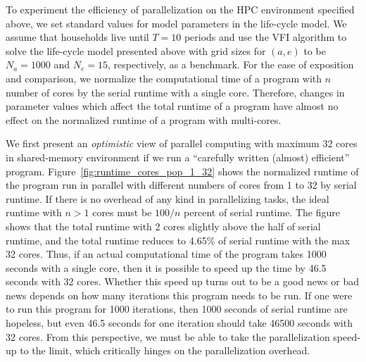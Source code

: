 \documentclass[12pt]{article}
\begin{document}
To experiment the efficiency of parallelization on the HPC environment specified above, we set standard values for model parameters in the life-cycle model. We assume that households live until $T=10$ periods and use the VFI algorithm to solve the life-cycle model presented above with grid sizes for $(a,e)$ to be $N_a = 1000$ and $N_e=15$, respectively, as a benchmark. For the ease of exposition and comparison, we normalize the computational time of a program with $n$ number of cores by the serial runtime with a single core. Therefore, changes in parameter values which affect the total runtime of a program have almost no effect on the normalized runtime of a program with multi-cores.


We first present an \textit{optimistic} view of parallel computing with maximum 32 cores in shared-memory environment if we run a ``carefully written (almost) efficient'' program. Figure~\ref{fig:runtime_cores_pop_1_32} shows the normalized runtime of the program run in parallel with different numbers of cores from 1 to 32 by serial runtime. If there is no overhead of any kind in parallelizing tasks, the ideal runtime with $n>1$ cores must be $100/n$ percent of serial runtime. The figure shows that the total runtime with 2 cores slightly above the half of serial runtime, and the total runtime reduces to 4.65\% of serial runtime with the max 32 cores. Thus, if an actual computational time of the program takes 1000 seconds with a single core, then it is possible to speed up the time by 46.5 seconds with 32 cores. Whether this speed up turns out to be a good news or bad news depends on how many iterations this program needs to be run. If one were to run this program for 1000 iterations, then 1000 seconds of serial runtime are hopeless, but even 46.5 seconds for one iteration should take 46500 seconds with 32 cores. From this perspective, we must be able to take the parallelization speed-up to the limit, which critically hinges on the parallelization overhead.
\end{document}
